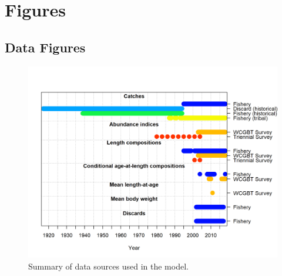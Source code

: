 \documentclass[12pt,]{article}
\begin{document}
\clearpage
\FloatBarrier

\newpage

\FloatBarrier
\newpage

\hypertarget{figures}{%
\section{Figures}\label{figures}}

\hypertarget{data-figures}{%
\subsection{Data Figures}\label{data-figures}}

\begin{figure}[!h]
\begin{centering}
\includegraphics{r4ss/plots_mod1/data_plot.png}
\caption{Summary of data sources used in the model.}\label{fig:data_plot}
\end{centering}
\end{figure}

\clearpage

\FloatBarrier

\newpage
\end{document}
